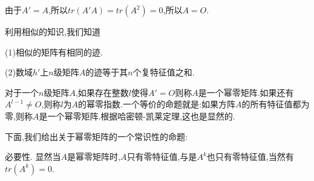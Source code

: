 \documentclass{article}
\begin{document}
\vspace{1ex}
 

 由于$A' = A$,所以$tr \left(A'A\right) = tr \left(A^2\right) = 0$,所以$A = O$.

利用相似的知识,我们知道

 (1)相似的矩阵有相同的迹.

(2)数域$h'$上$n$级矩阵$A$的迹等于其$n$个复特征值之和.

\vspace{1ex}
对于一个$n$级矩阵$A$,如果存在整数$l$使得$A' = O$则称$A$是一个幂零矩阵.如果还有$A^{l - 1} \neq O$,则称$l$为$A$的幂零指数.一个等价的命题就是:如果方阵$A$的所有特征值都为零,则称$A$是一个幂零矩阵.根据哈密顿-凯莱定理,这也是显然的.

下面,我们给出关于幂零矩阵的一个常识性的命题:

\vspace{1ex}
 

 必要性. 显然当$A$是幂零矩阵时,$A$只有零特征值,与是$A^k$也只有零特征值,当然有$tr \left(A^k\right) = 0$.
\end{document}
